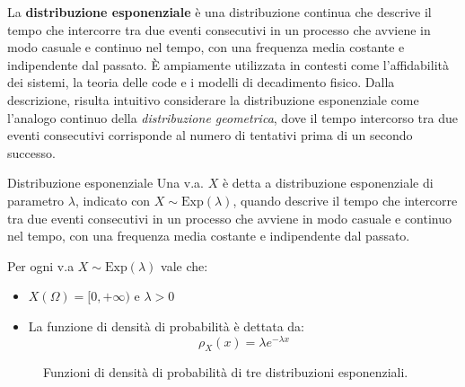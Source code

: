 \documentclass[a4paper, 12pt]{report}
\begin{document}
    La \textbf{distribuzione esponenziale} è una distribuzione continua che descrive il tempo che intercorre tra due eventi consecutivi in un processo che avviene in modo casuale e continuo nel tempo, con una frequenza media costante e indipendente dal passato. È ampiamente utilizzata in contesti come l'affidabilità dei sistemi, la teoria delle code e i modelli di decadimento fisico. Dalla descrizione, risulta intuitivo considerare la distribuzione esponenziale come l'analogo continuo della \textit{distribuzione geometrica}, dove il tempo intercorso tra due eventi consecutivi corrisponde al numero di tentativi prima di un secondo successo.

    \begin{frameddefn}{Distribuzione esponenziale}
        Una v.a. $X$ è detta a distribuzione esponenziale di parametro $\lambda$, indicato con $X \sim \mathrm{Exp}(\lambda)$, quando descrive il tempo che intercorre tra due eventi consecutivi in un processo che avviene in modo casuale e continuo nel tempo, con una frequenza media costante e indipendente dal passato.

        Per ogni v.a $X \sim \mathrm{Exp}(\lambda)$ vale che:
        \begin{itemize}
            \item $X(\Omega) = [0,+\infty)$ e $\lambda > 0$
            \item La funzione di densità di probabilità è dettata da:
            \[\rho_X(x) = \lambda e^{-\lambda x}\]
        \end{itemize}
    \end{frameddefn}

    \begin{figure}[H]
        \centering

        \caption{Funzioni di densità di probabilità di tre distribuzioni esponenziali.}
    \end{figure}
\end{document}
